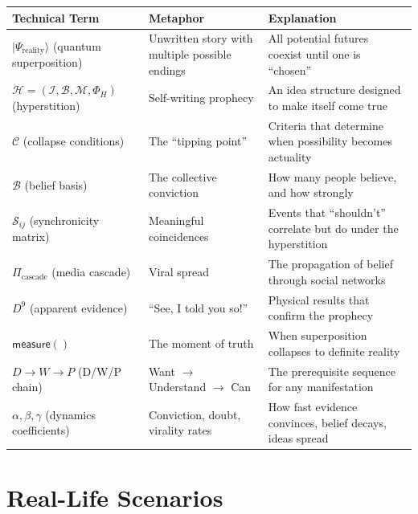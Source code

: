 \begin{center}
\small
\renewcommand{\arraystretch}{1.4}
\begin{tabularx}{\textwidth}{>{\raggedright\arraybackslash}p{3.5cm}|>{\raggedright\arraybackslash}X|>{\raggedright\arraybackslash}X}
\toprule
\textbf{Technical Term} & \textbf{Metaphor} & \textbf{Explanation} \\
\midrule
$|\Psi_{\text{reality}}\rangle$ (quantum superposition) & Unwritten story with multiple possible endings & All potential futures coexist until one is ``chosen'' \\
\midrule
$\mathcal{H} = (\mathcal{I}, \mathcal{B}, \mathcal{M}, \Phi_H)$ (hyperstition) & Self-writing prophecy & An idea structure designed to make itself come true \\
\midrule
$\mathcal{C}$ (collapse conditions) & The ``tipping point'' & Criteria that determine when possibility becomes actuality \\
\midrule
$\mathcal{B}$ (belief basis) & The collective conviction & How many people believe, and how strongly \\
\midrule
$\mathcal{S}_{ij}$ (synchronicity matrix) & Meaningful coincidences & Events that ``shouldn't'' correlate but do under the hyperstition \\
\midrule
$\Pi_{\text{cascade}}$ (media cascade) & Viral spread & The propagation of belief through social networks \\
\midrule
$D^9$ (apparent evidence) & ``See, I told you so!'' & Physical results that confirm the prophecy \\
\midrule
$\mathsf{measure}()$ & The moment of truth & When superposition collapses to definite reality \\
\midrule
$D \to W \to P$ (D/W/P chain) & Want $\to$ Understand $\to$ Can & The prerequisite sequence for any manifestation \\
\midrule
$\alpha, \beta, \gamma$ (dynamics coefficients) & Conviction, doubt, virality rates & How fast evidence convinces, belief decays, ideas spread \\
\bottomrule
\end{tabularx}
\end{center}

\section{Real-Life Scenarios}
\label{sec:scenarios}

